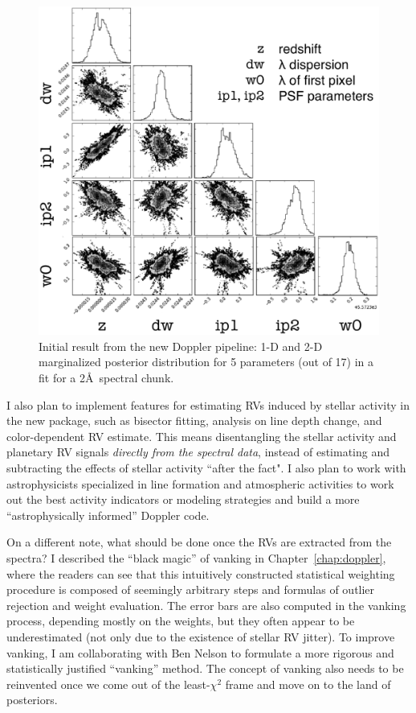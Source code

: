 \begin{figure}
\centering
\includegraphics[scale=0.25]{conclusion/mcmcplot-labeled.eps}
\caption{Initial result from the new Doppler pipeline: 1-D and 2-D
  marginalized posterior distribution for 5 parameters (out of 17)
  in a fit for a 2\AA\ spectral chunk. 
\label{conclusion:fig:mcmc}}
\end{figure}


I also plan to implement features for estimating RVs induced by
stellar activity in the new package, such as bisector fitting,
analysis on line depth change, and color-dependent RV estimate. This
means disentangling the stellar activity and planetary RV signals
{\em directly from the spectral data}, instead of
estimating and subtracting the effects of stellar activity ``after the
fact". I also plan to work with astrophysicists specialized in line
formation and atmospheric activities to work out the best activity
indicators or modeling strategies and build a more ``astrophysically
informed'' Doppler code.

On a different note, what should be done once the RVs are extracted
from the spectra? I described the ``black magic'' of vanking in
Chapter~\ref{chap:doppler}, where the readers can see that this
intuitively constructed statistical weighting procedure is composed of
seemingly arbitrary steps and formulas of outlier rejection and weight
evaluation. The error bars are also computed in the vanking process,
depending mostly on the weights, but they often appear to be
underestimated (not only due to the existence of stellar RV
jitter). To improve vanking, I am collaborating with Ben Nelson to
formulate a more rigorous and statistically justified ``vanking''
method. The concept of vanking also needs to be reinvented once we
come out of the least-$\chi^2$ frame and move on to the land of
posteriors.


